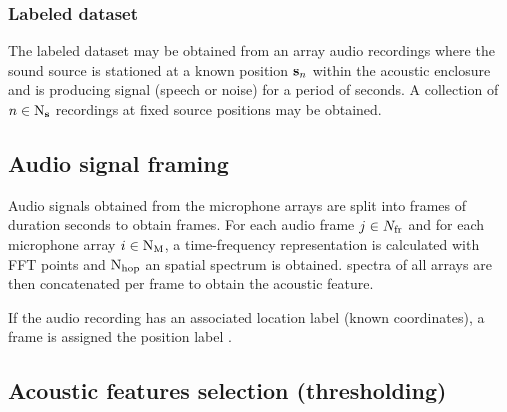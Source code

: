 \documentclass[applsci,article,submit,moreauthors,pdftex]{Definitions/mdpi}
\begin{document}
\subsubsection{Labeled dataset}
The labeled dataset may be obtained from an array audio recordings where the sound source is stationed at a known position $ \mathbf{s}_{n} $ within the acoustic enclosure and is producing signal (speech or noise) for a period of  seconds. A collection of $ n \in \mathrm{N}_{\mathbf{s}} $ recordings at fixed source positions may be obtained.

\subsection{Audio signal framing}

Audio signals obtained from the microphone arrays are split into frames of duration \framedur{} seconds to obtain \Nframes{} frames. For each audio frame $ j{} \in N_{\mathrm{fr}}{} $ and for each microphone array $ i{} \in \mathrm{N}_{\mathrm{M}} $, a time-frequency representation is calculated with \NFFT{} FFT points and $ \mathrm{N}_{\mathrm{hop}} $  an \srpphat{} spatial spectrum \SRPspectrum{} is obtained. 
\srpphat{} spectra of all arrays are then concatenated per frame to obtain the acoustic feature.

If the audio recording has an associated location label (known coordinates), a frame is assigned the position label \sposlabel{}.

\subsection{Acoustic features selection (thresholding)}
\end{document}
